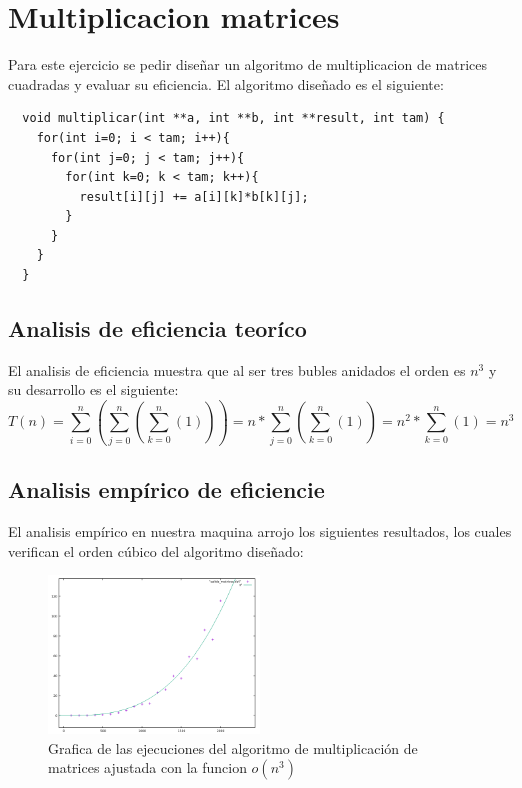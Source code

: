 \section{Multiplicacion matrices}

Para este ejercicio se pedir diseñar un algoritmo de multiplicacion de matrices cuadradas y evaluar su eficiencia. El algoritmo diseñado es el siguiente:

\begin{lstlisting}
  void multiplicar(int **a, int **b, int **result, int tam) {
    for(int i=0; i < tam; i++){ 
      for(int j=0; j < tam; j++){
        for(int k=0; k < tam; k++){
          result[i][j] += a[i][k]*b[k][j];
        }
      }
    }
  }
\end{lstlisting}
\subsection{Analisis de eficiencia teoríco}

El analisis de eficiencia muestra que al ser tres bubles anidados el orden es $n^{3}$ y su desarrollo es el siguiente:
\begin{equation}
T(n)=\sum_{i=0}^{n}(\sum_{j=0}^{n}(\sum_{k=0}^{n}(1)))=n*\sum_{j=0}^{n}(\sum_{k=0}^{n}(1))=n^{2}*\sum_{k=0}^{n}(1)=n^{3}
\end{equation}

\subsection{Analisis empírico de eficiencie}

El analisis empírico en nuestra maquina arrojo los siguientes resultados, los cuales verifican el orden cúbico del algoritmo diseñado:

\begin{figure}[H]
  \centering
  \includegraphics[width=0.5\textwidth]{./Imagenes/mult_matrices_ajustada.png}
  \caption{Grafica de las ejecuciones del algoritmo de multiplicación de matrices ajustada con la funcion $o(n^{3})$}
\end{figure}


